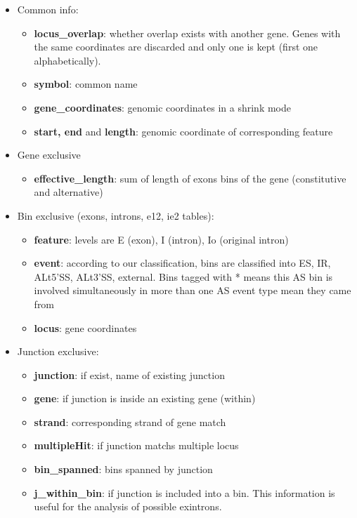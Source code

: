 \documentclass{article}
\begin{document}
\begin{itemize}
\item Common info:
    \begin{itemize}
    \item \textbf{locus\_overlap}: whether overlap exists with another gene. Genes with the same coordinates are discarded and only one is kept (first one alphabetically).    
    \item \textbf{symbol}: common name
    \item \textbf{gene\_coordinates}: genomic coordinates in a shrink mode
    \item \textbf{start, end}  and \textbf{length}: genomic coordinate of corresponding feature
  \end{itemize}
\item Gene exclusive 
  \begin{itemize}
  \item \textbf{effective\_length}: sum of length of exons bins of the gene (constitutive and alternative)
  \end{itemize}
\item Bin exclusive (exons, introns, e12, ie2 tables):
\begin{itemize}
    \item \textbf{feature}: levels are E (exon), I (intron), Io (original intron)
    \item \textbf{event}: according to our classification, bins are classified into ES, IR, ALt5'SS, ALt3'SS, external. Bins tagged with * means this AS bin is involved simultaneously in more than one AS event type mean they came from 
  \item \textbf{locus}: gene coordinates
\end{itemize}
\item Junction exclusive:
  \begin{itemize}
  \item \textbf{junction}: if exist, name of existing junction 
   \item \textbf{gene}: if junction is inside  an existing gene (within)
  \item \textbf{strand}: corresponding strand of gene match
  \item \textbf{multipleHit}: if junction matchs multiple locus
  \item \textbf{bin\_spanned}: bins  spanned by junction 
  \item \textbf{j\_within\_bin}: if junction is included  into a bin. This information is useful for the analysis of possible exintrons. 
\end{itemize}
\end{itemize} 
\end{document}
